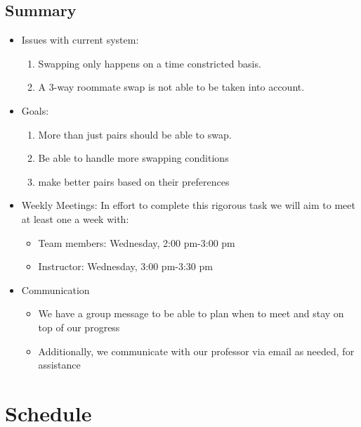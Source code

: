 \documentclass[12pt]{article}
\begin{document}
\subsection*{Summary}
\begin{itemize}
\item Issues with current system:
\begin{enumerate}
\item Swapping only happens on a time constricted basis.
\item A 3-way roommate swap is not able to be taken into account.
\end {enumerate}
\item Goals:
\begin{enumerate}
\item More than just pairs should be able to swap.
\item Be able to handle more swapping conditions
\item make better pairs based on their preferences 
\end {enumerate}
\item Weekly Meetings: In effort to complete this rigorous task we will aim to meet at least one a week with:
\begin{itemize}
\item Team members: Wednesday, 2:00 pm-3:00 pm
\item Instructor: Wednesday, 3:00 pm-3:30 pm
\end{itemize}
\item Communication
\begin{itemize}
\item We have a group message to be able to plan when to meet and stay on top of our progress
\item Additionally, we communicate with our professor via email as needed, for assistance
\end{itemize}
\end{itemize}

\section*{Schedule}
\end{document}
